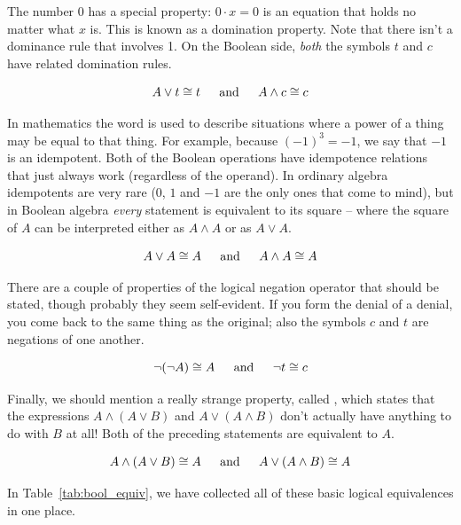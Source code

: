 The number 0 has a special property: $0 \cdot x = 0$ is an equation that 
holds no matter what $x$ is.  This is known as a domination property.  Note 
that there isn't a dominance rule that involves 1.
 On the Boolean side, 
{\em both} the symbols $t$ and $c$ have related domination rules.

\[ A \lor t \cong t \mbox{\rule{12pt}{0pt} and \rule{12pt}{0pt}} 
A \land c \cong c \]
 
In mathematics the word  is used to describe situations where 
a power of a thing may be equal to that thing.  For example, because $(-1)^3 = -1$, we say that $-1$ is an idempotent.  Both of the Boolean operations 
have idempotence relations that just always work (regardless of the operand).
In ordinary algebra idempotents are very rare ($0$, $1$ and $-1$ are the only
ones that come to mind), but in Boolean algebra {\em every} statement
is equivalent to its square -- where the square of $A$ can be interpreted 
either as $A \land A$ or as $A \lor A$.

\[ A \lor A \cong A \mbox{\rule{12pt}{0pt} and \rule{12pt}{0pt}}%
A \land A \cong A \]

There are a couple of properties of the logical negation operator 
that should be stated, though probably they seem self-evident.
If you form the denial of a denial, you come back to the 
same thing as the original; also the symbols $c$ and $t$ are negations
of one another.

\[ \lnot({\lnot}A) \cong A \mbox{\rule{12pt}{0pt} and \rule{12pt}{0pt}}%
{\lnot}t  \cong c \] 

Finally, we should mention a really strange property, called 
,
which states that the expressions $A \land (A \lor B)$ and $A \lor (A \land B)$
don't actually have anything to do with $B$ at all!  Both of the preceding
statements are equivalent to $A$.

\[ A \land (A \lor B) \cong A \mbox{\rule{12pt}{0pt} and \rule{12pt}{0pt}}%
A \lor (A \land B) \cong A \]

In Table~\ref{tab:bool_equiv}, we have collected all of these basic logical
equivalences in one place.

